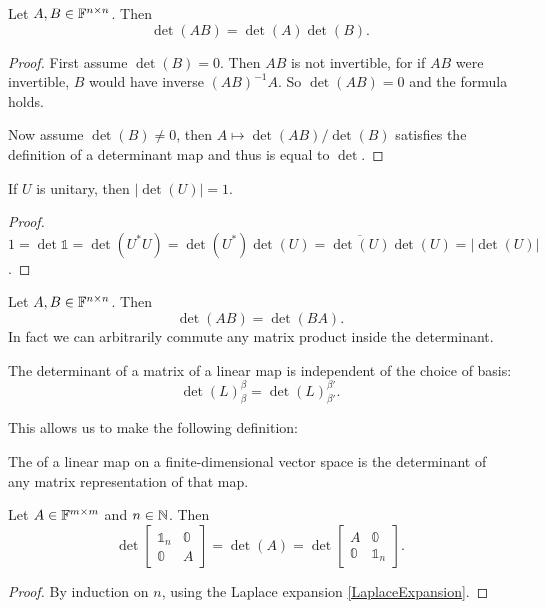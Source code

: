 \begin{proposition} \label{productRuleDeterminants}
Let $A,B\in\mathbb{F}^{n\times n}$. Then
\[ \det(AB) = \det(A)\det(B). \]
\end{proposition}
\begin{proof}
First assume $\det(B) = 0$. Then $AB$ is not invertible, for if $AB$ were invertible, $B$ would have inverse $(AB)^{-1}A$. So $\det(AB) = 0$ and the formula holds.

Now assume $\det(B) \neq 0$, then $A\mapsto \det(AB)/\det(B)$ satisfies the definition of a determinant map and thus is equal to $\det$.
\end{proof}
\begin{corollary}
If $U$ is unitary, then $|\det(U)| = 1$.
\end{corollary}
\begin{proof}
$1=\det{\mathbb{1}} = \det(U^*U) = \det(U^*)\det(U) = \overline{\det(U)}\det(U) = |\det(U)|$.
\end{proof}
\begin{corollary}
Let $A,B\in\mathbb{F}^{n\times n}$. Then
\[ \det(AB) = \det(BA). \]
In fact we can arbitrarily commute any matrix product inside the determinant.
\end{corollary}
\begin{corollary}
The determinant of a matrix of a linear map is independent of the choice of basis:
\[ \det(L)_{\beta}^{\beta} = \det(L)_{\beta'}^{\beta'}. \]
\end{corollary}
This allows us to make the following definition:
\begin{definition}
The  of a linear map on a finite-dimensional vector space is the determinant of any matrix representation of that map.
\end{definition}

\begin{lemma} \label{determinantIdOplusMatrix}
Let $A\in\mathbb{F}^{m\times m}$ and $n\in\mathbb{N}$. Then
\[ \det\begin{bmatrix}
\mathbb{1}_n & \mathbb{0} \\ \mathbb{0} & A
\end{bmatrix} = \det(A) = \det\begin{bmatrix}
A & \mathbb{0} \\ \mathbb{0} & \mathbb{1}_n
\end{bmatrix}. \]
\end{lemma}
\begin{proof}
By induction on $n$, using the Laplace expansion \ref{LaplaceExpansion}.
\end{proof}

